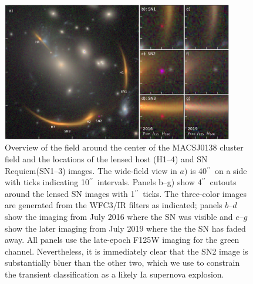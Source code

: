 \documentclass[12pt,dvipsnames]{article}
\gdef\arcsec{$^{\prime\prime}$}
\def\SNABC{SN Requiem\xspace}
\begin{document}

\clearpage
\begin{figure}
    \centering
    \includegraphics[width=0.9\textwidth]{Paper/Figures/fig1_layout.pdf}
    \caption{Overview of the field around the center of the MACSJ0138 cluster field and the locations of the lensed host (H1--4) and \SNABC (SN1--3) images. The wide-field view in $a)$ is 40\arcsec\ on a side with ticks indicating 10\arcsec\ intervals.  Panels b--g) show 4\arcsec\ cutouts around the lensed SN images with 1\arcsec\ ticks.  The three-color images are generated from the WFC3/IR filters as indicated; panels $b$--$d$ show the imaging from July 2016 where the SN was visible and $e$--$g$ show the later imaging from July 2019 where the the SN has faded away.  All panels use the late-epoch F125W imaging for the green channel.  Nevertheless, it is immediately clear that the SN2 image is substantially bluer than the other two, which we use to constrain the transient classification as a likely Ia supernova explosion.}
    
    \label{fig:layout}
\end{figure}
\clearpage
\end{document}
